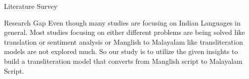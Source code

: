 \begin{chapter}{Literature Survey}
    \begin{section}{Research Gap}
        Even though many studies are focusing on Indian Languages in general. Most studies focusing on either different problems are being solved like translation or sentiment analysis or Manglish to Malayalam like transliteration models are not explored much. So our study is to utilize the given insights to build a transliteration model that converts from Manglish script to Malayalam Script.
    \end{section}
    
\end{chapter}